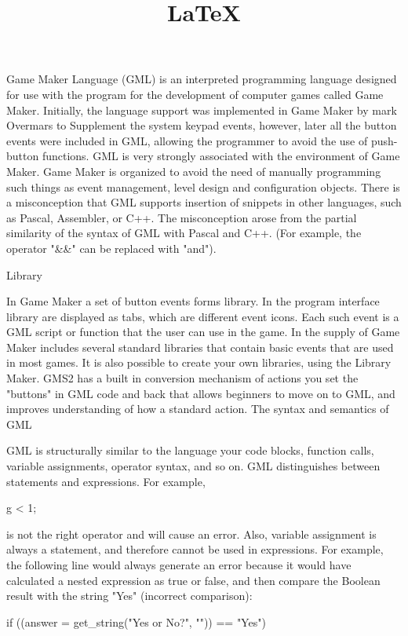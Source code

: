 \documentclass[12pt]{article}
\title{\LaTeX}
\date{}
\author{}
\begin{document}
 
\maketitle 
Game Maker Language (GML) is an interpreted programming language designed for use with the program for the development of computer games called Game Maker. Initially, the language support was implemented in Game Maker by mark Overmars to Supplement the system keypad events, however, later all the button events were included in GML, allowing the programmer to avoid the use of push-button functions. GML is very strongly associated with the environment of Game Maker. Game Maker is organized to avoid the need of manually programming such things as event management, level design and configuration objects. There is a misconception that GML supports insertion of snippets in other languages, such as Pascal, Assembler, or C++. The misconception arose from the partial similarity of the syntax of GML with Pascal and C++. (For example, the operator "\&\&" can be replaced with "and").{}

Library{}

In Game Maker a set of button events forms library. In the program interface library are displayed as tabs, which are different event icons. Each such event is a GML script or function that the user can use in the game. In the supply of Game Maker includes several standard libraries that contain basic events that are used in most games. It is also possible to create your own libraries, using the Library Maker. GMS2 has a built in conversion mechanism of actions you set the "buttons" in GML code and back that allows beginners to move on to GML, and improves understanding of how a standard action.
The syntax and semantics of GML{}

GML is structurally similar to the language your code blocks, function calls, variable assignments, operator syntax, and so on. GML distinguishes between statements and expressions. For example,{}

g < 1;{}

is not the right operator and will cause an error. Also, variable assignment is always a statement, and therefore cannot be used in expressions. For example, the following line would always generate an error because it would have calculated a nested expression as true or false, and then compare the Boolean result with the string "Yes" (incorrect comparison):{}

if ((answer = get_string("Yes or No?", "")) == "Yes"){}
\end{document}
